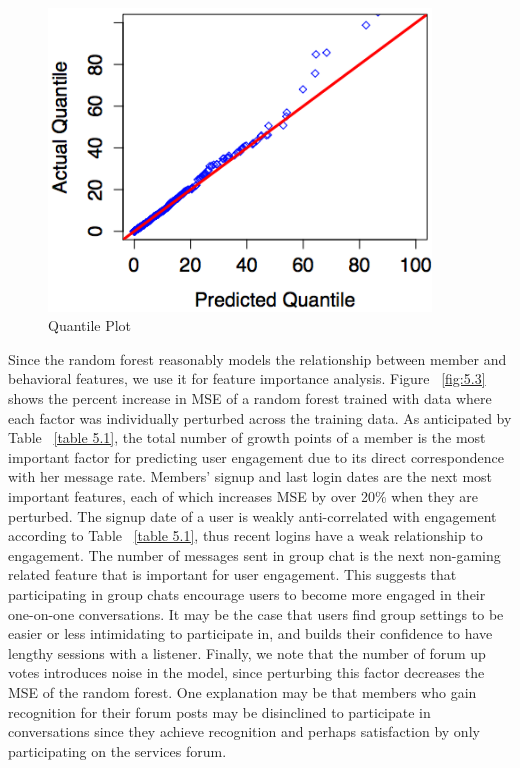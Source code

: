 \begin{figure}
	\centering %
	\includegraphics[width=4in]{Quantile.png} %
	\caption{Quantile Plot} 
	\label{fig:5.1}
\end{figure}

Since the random forest reasonably models the relationship between member and behavioral features, we use it for feature importance analysis. Figure ~\ref{fig:5.3} shows the percent increase in MSE of a random forest trained with data where each factor was individually perturbed across the training data. As anticipated by Table ~\ref{table 5.1}, the total number of growth points of a member is the most important factor for predicting user engagement due to its direct correspondence with her message rate. Members’ signup and last login dates are the next most important features, each of which increases MSE by over 20\% when they are perturbed. The signup date of a user is weakly anti-correlated with engagement according to Table ~\ref{table 5.1}, thus recent logins have a weak relationship to engagement. The number of messages sent in group chat is the next non-gaming related feature that is important for user engagement. This suggests that participating in group chats encourage users to become more engaged in their one-on-one conversations. It may be the case that users find group settings to be easier or less intimidating to participate in, and builds their confidence to have lengthy sessions with a listener. Finally, we note that the number of forum up votes introduces noise in the model, since perturbing this factor decreases the MSE of the random forest. One explanation may be that members who gain recognition for their forum posts may be disinclined to participate in conversations since they achieve recognition and perhaps satisfaction by only participating on the services forum. 

